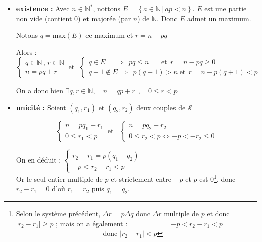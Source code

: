 \documentclass{report}
\newcommand{\N}{\mathbb{N}}
\begin{document}
          \begin{tcolorbox}[colback=white, colframe=black, boxrule=0.8pt, width=1\textwidth]

            \begin{itemize}
              \item \textbf{existence : } Avec $n\in\N^*$, nottons $E=\left\{a\in\N \,|\, ap < n\right\}$. $E$ est une partie non vide (contient 0) et majorée (par $n$) de $\N$. Donc $E$ admet un maximum. 

                    Notons $\boxed{q = \text{max}(E)}$ ce maximum et $\boxed{r = n-pq}$

                    Alors : 
                    \[\begin{cases}
                      q\in\N \, , \, r\in\N \\
                      n = pq + r
                    \end{cases} 
                    ~\text{et}~~~ 
                    \begin{cases}
                      q\in E ~~~~~~ \Rightarrow ~~ pq \le n ~~~~~~~~\text{et}~~ r = n-pq \ge 0\\
                      q+1\not\in E ~ \Rightarrow ~~ p(q+1) > n ~\text{et}~~ r = n-p(q+1) < p 
                    \end{cases}\]

                    On a donc bien $\exists q,r \in \mathbb{N}, \quad n = qp + r ~~, \quad 0\le r<p$
                \item \textbf{unicité : } Soient $(q_1, r_1)$ et $(q_2, r_2)$ deux couples de $\mathcal{S}$

                    \[\begin{cases}
                      n = pq_1 + r_1 \\
                      0\le r_1 < p 
                    \end{cases}
                    ~\text{et}~~~~ 
                    \begin{cases}
                      n = pq_2 + r_2 \\
                      0\le r_2 < p \iff -p < -r_2 \le 0
                    \end{cases}\]

                    On en déduit : \(\begin{cases}
                      r_2-r_1 = p (q_1 - q_2)\\
                      -p<r_2-r_1<p
                    \end{cases}\) \\
                    Or le seul entier multiple de $p$ et strictement entre $-p$ et $p$ est 0\footnote{Selon le système précédent, $\Delta r = p \Delta q$ donc $\Delta r$ multiple de $p$ et donc $|r_2-r_1|\ge p$ ; \newline mais on a également : ~~~~~~~~~~~ $-p < r_2-r_1 < p$ ~~~~~~~~~~~~~~~~~~~~~~~~ donc $|r_2-r_1| < p$},
                    donc $r_2-r_1 = 0$ d'où $r_1=r_2$ puis $q_1=q_2$.


\end{itemize}
\end{tcolorbox}
\end{document}
